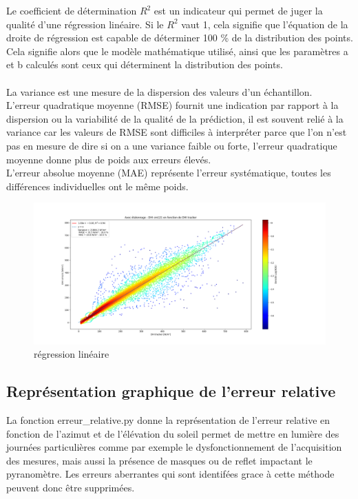 \documentclass[12pt,a4paper]{article}
\begin{document}
\begin{flushleft}
Le coefficient de détermination $R^2$ est un indicateur qui permet de juger la qualité d’une régression linéaire. Si le $R^2$ vaut 1, cela signifie que l’équation de la droite de régression est capable de déterminer 100 \% de la distribution des points. Cela signifie alors que le modèle mathématique utilisé, ainsi que les paramètres a et b calculés sont ceux qui déterminent la distribution des points.\\
~~\\
La variance est une mesure de la dispersion des valeurs d'un échantillon.
~~\\
L'erreur quadratique moyenne (RMSE) fournit une indication par rapport à la dispersion ou la variabilité de la qualité de la prédiction, il est souvent relié à la variance car les valeurs de RMSE sont difficiles à interpréter parce que l’on n'est pas en mesure de dire si on a une variance faible ou forte, l'erreur quadratique moyenne donne plus de poids aux erreurs élevés.
~\\ 

L'erreur absolue moyenne (MAE) représente l'erreur systématique, toutes les différences individuelles ont le même poids.\\

\begin{figure}[H]
\centering
\includegraphics[width=15cm]{image/etallonnage/1.png} 
\caption{régression linéaire}  
\end{figure}

\subsection{Représentation graphique de l'erreur relative}

La fonction erreur\_relative.py donne la représentation de l'erreur relative en fonction de l'azimut et de l'élévation du soleil permet de mettre en lumière des journées particulières comme par exemple le dysfonctionnement de l'acquisition des mesures, mais aussi la présence de masques ou de reflet impactant le pyranomètre. Les erreurs aberrantes qui sont identifées grace à cette méthode peuvent donc être supprimées.\\
 

\end{flushleft}
\end{document}
